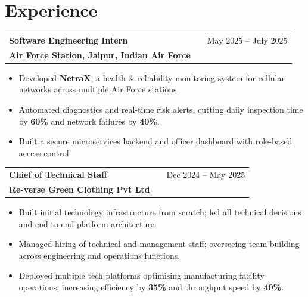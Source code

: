 \documentclass[a4paper,10pt]{article}
\begin{document}
\section{Experience}

\begin{tabularx}{\linewidth}{ @{}l X r@{} }
\textbf{Software Engineering Intern} & \hfill & \textcolor[HTML]{371e77}{May 2025 -- July 2025} \\
\textcolor[HTML]{371e77}{\textbf{Air Force Station, Jaipur, Indian Air Force}} & & \\
\end{tabularx}
\vspace{-8pt}
\begin{itemize}[nosep, leftmargin=1.5em, itemsep=0pt, topsep=0pt]
\item Developed \textbf{NetraX}, a health \& reliability monitoring system for cellular networks across multiple Air Force stations.
\item Automated diagnostics and real-time risk alerts, cutting daily inspection time by \textbf{60\%} and network failures by \textbf{40\%}.
\item Built a secure microservices backend and officer dashboard with role-based access control.
\end{itemize}

\begin{tabularx}{\linewidth}{ @{}l X r@{} }
\textbf{Chief of Technical Staff} & \hfill & \textcolor[HTML]{371e77}{Dec 2024 -- May 2025} \\
\textcolor[HTML]{371e77}{\textbf{Re-verse Green Clothing Pvt Ltd}} & & \\
\end{tabularx}
\vspace{-8pt}
\begin{itemize}[nosep, leftmargin=1.5em, itemsep=0pt, topsep=0pt]
\item Built initial technology infrastructure from scratch; led all technical decisions and end-to-end platform architecture.
\item Managed hiring of technical and management staff; overseeing team building across engineering and operations functions.
\item Deployed multiple tech platforms optimising manufacturing facility operations, increasing efficiency by \textbf{35\%} and throughput speed by \textbf{40\%}.
\end{itemize}
\end{document}
